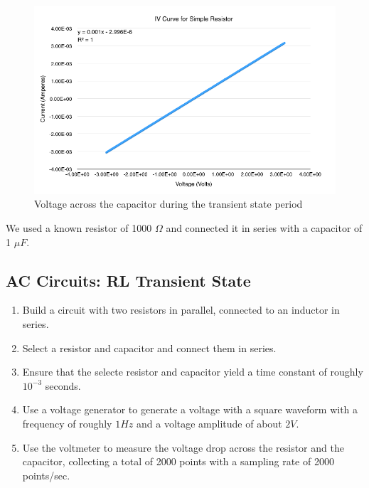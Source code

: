 \documentclass{article}
\begin{document}
\begin{figure}[H]
    \centering
    \includegraphics[width=\textwidth]{charts/rccurve_transient}
    \caption{Voltage across the capacitor during the transient state period}
    \label{rccurve_transient}
\end{figure}

We used a known resistor of 1000 $\Omega$ and connected it in series with
a capacitor of 1 $\mu F$.

\subsection{AC Circuits: RL Transient State}

\begin{enumerate}
    \item Build a circuit with two resistors in parallel, connected to an
    inductor in series.
    \item Select a resistor and capacitor and connect them in series.
    \item Ensure that the selecte resistor and capacitor yield a time constant
    of roughly $10^{-3}$ seconds.
    \item Use a voltage generator to generate a voltage with a square waveform
    with a frequency of roughly $1 Hz$ and a voltage amplitude of about $2 V$.
    \item Use the voltmeter to measure the voltage drop across the resistor and
    the capacitor, collecting a total of 2000 points with a sampling rate of
    2000 points/sec.
\end{enumerate}
\end{document}
